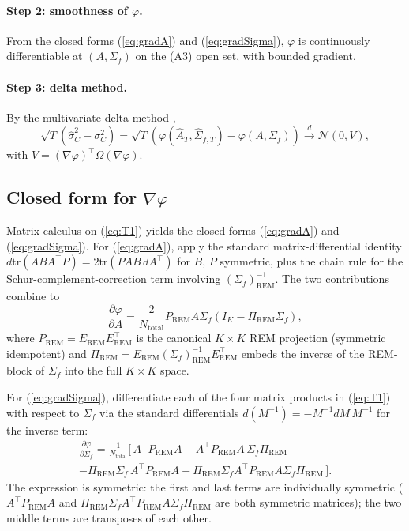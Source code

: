\documentclass[11pt,letterpaper]{article}
\theoremstyle{remark}
\newcommand{\REM}{\mathrm{REM}}
\newcommand{\Sigmaf}{\Sigma_f}
\newcommand{\PiREM}{\Pi_{\REM}}
\newcommand{\PREM}{P_{\REM}}
\newcommand{\Ntot}{N_{\mathrm{total}}}
\newcommand{\sigC}{\sigma^2_C}
\newcommand{\hatsigC}{\widehat{\sigma}^2_C}
\newcommand{\Ehat}{\widehat{A}}
\newcommand{\trace}{\mathrm{tr}}
\begin{document}
\paragraph{Step 2: smoothness of $\varphi$.} From the closed forms (\ref{eq:gradA}) and (\ref{eq:gradSigma}), $\varphi$ is continuously differentiable at $(A, \Sigmaf)$ on the (A3) open set, with bounded gradient.

\paragraph{Step 3: delta method.} By the multivariate delta method \cite[Theorem~3.1]{vanderVaart1998},
\begin{equation*}
\sqrt{T}(\hatsigC - \sigC) = \sqrt{T} (\varphi(\Ehat_T, \widehat{\Sigma}_{f, T}) - \varphi(A, \Sigmaf)) \xrightarrow{d} \mathcal{N}(0, V),
\end{equation*}
with $V = (\nabla \varphi)^\top \Omega (\nabla \varphi)$.

\subsection{\texorpdfstring{Closed form for $\nabla \varphi$}{Closed form for grad phi}}

Matrix calculus on (\ref{eq:T1}) yields the closed forms (\ref{eq:gradA}) and (\ref{eq:gradSigma}). For (\ref{eq:gradA}), apply the standard matrix-differential identity $d \trace(A B A^\top P) = 2 \trace(P A B \, dA^\top)$ for $B$, $P$ symmetric, plus the chain rule for the Schur-complement-correction term involving $(\Sigmaf)_\REM^{-1}$. The two contributions combine to
\begin{equation*}
\frac{\partial \varphi}{\partial A} = \frac{2}{\Ntot} \PREM A \Sigmaf (I_K - \PiREM \Sigmaf),
\end{equation*}
where $\PREM = E_\REM E_\REM^\top$ is the canonical $K \times K$ REM projection (symmetric idempotent) and $\PiREM = E_\REM (\Sigmaf)_\REM^{-1} E_\REM^\top$ embeds the inverse of the REM-block of $\Sigmaf$ into the full $K \times K$ space.

For (\ref{eq:gradSigma}), differentiate each of the four matrix products in (\ref{eq:T1}) with respect to $\Sigmaf$ via the standard differentials $d (M^{-1}) = -M^{-1} dM \, M^{-1}$ for the inverse term:
\begin{multline*}
\frac{\partial \varphi}{\partial \Sigmaf} = \tfrac{1}{\Ntot} \bigl[\, A^\top \PREM A - A^\top \PREM A \, \Sigmaf \PiREM \\
- \PiREM \Sigmaf \, A^\top \PREM A + \PiREM \Sigmaf A^\top \PREM A \Sigmaf \PiREM \,\bigr].
\end{multline*}
The expression is symmetric: the first and last terms are individually symmetric ($A^\top \PREM A$ and $\PiREM \Sigmaf A^\top \PREM A \Sigmaf \PiREM$ are both symmetric matrices); the two middle terms are transposes of each other.
\end{document}
